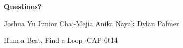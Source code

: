 \presenter{}

{
\begin{frame}[plain]
  \centering
  \vspace*{2.2cm}
  {\fontsize{31}{36}\selectfont\bfseries Questions?\par}
  \vspace{0.5cm}
  {\fontsize{13}{16}\selectfont
  Joshua Yu \quad Junior Chaj-Mejia \quad Anika Nayak \quad Dylan Palmer\par}
  \vspace{0.25cm}
  {\fontsize{11}{14}\selectfont\color{gray} Hum a Beat, Find a Loop \quad$\cdot$\quad CAP 6614\par}
  \vfill
\end{frame}
}

